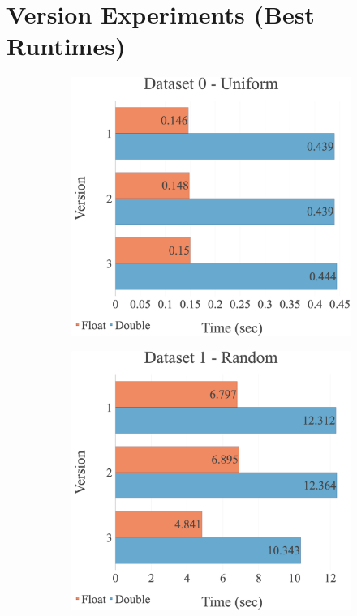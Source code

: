 \label{appendix:experiments:cudamulti}
\section{Version Experiments (Best Runtimes)}
\begin{figure}[H]
\begin{adjustwidth}{-2cm}{-2cm}
\centering
\begin{subfigure}{.62\textwidth}
    \centering
    \includegraphics[width=1\textwidth]{img/experiments/multi-versions-0_UNIFORM.png}
\end{subfigure}
\begin{subfigure}{.62\textwidth}
    \centering
    \includegraphics[width=1\textwidth]{img/experiments/multi-versions-1_RAND.png}

\end{subfigure}
\end{adjustwidth}
\end{figure}
